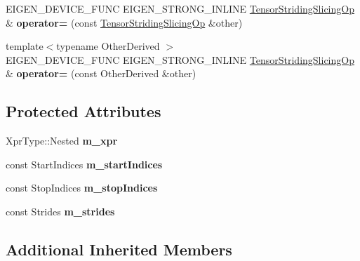 \begin{DoxyCompactItemize}
\mbox{\label{class_eigen_1_1_tensor_striding_slicing_op_a39d41bdf78c1031b8d714adb18bb5338}} 
E\+I\+G\+E\+N\+\_\+\+D\+E\+V\+I\+C\+E\+\_\+\+F\+U\+NC E\+I\+G\+E\+N\+\_\+\+S\+T\+R\+O\+N\+G\+\_\+\+I\+N\+L\+I\+NE \hyperlink{class_eigen_1_1_tensor_striding_slicing_op}{Tensor\+Striding\+Slicing\+Op} \& {\bfseries operator=} (const \hyperlink{class_eigen_1_1_tensor_striding_slicing_op}{Tensor\+Striding\+Slicing\+Op} \&other)
\item 
\mbox{\label{class_eigen_1_1_tensor_striding_slicing_op_ab354f475443d80eef3c90a6656cfacd0}} 
{\footnotesize template$<$typename Other\+Derived $>$ }\\E\+I\+G\+E\+N\+\_\+\+D\+E\+V\+I\+C\+E\+\_\+\+F\+U\+NC E\+I\+G\+E\+N\+\_\+\+S\+T\+R\+O\+N\+G\+\_\+\+I\+N\+L\+I\+NE \hyperlink{class_eigen_1_1_tensor_striding_slicing_op}{Tensor\+Striding\+Slicing\+Op} \& {\bfseries operator=} (const Other\+Derived \&other)
\end{DoxyCompactItemize}
\subsection*{Protected Attributes}
\begin{DoxyCompactItemize}
\item 
\mbox{\label{class_eigen_1_1_tensor_striding_slicing_op_a64ea26a17f930c6ad30e9352c6669150}} 
Xpr\+Type\+::\+Nested {\bfseries m\+\_\+xpr}
\item 
\mbox{\label{class_eigen_1_1_tensor_striding_slicing_op_a84ca22b043a594d437a5aec863b5bc1e}} 
const Start\+Indices {\bfseries m\+\_\+start\+Indices}
\item 
\mbox{\label{class_eigen_1_1_tensor_striding_slicing_op_af14b20f0e45d9f6f13f9e0a23f7a405f}} 
const Stop\+Indices {\bfseries m\+\_\+stop\+Indices}
\item 
\mbox{\label{class_eigen_1_1_tensor_striding_slicing_op_af860ae2cac482a47a85a1faf38947b6b}} 
const Strides {\bfseries m\+\_\+strides}
\end{DoxyCompactItemize}
\subsection*{Additional Inherited Members}


